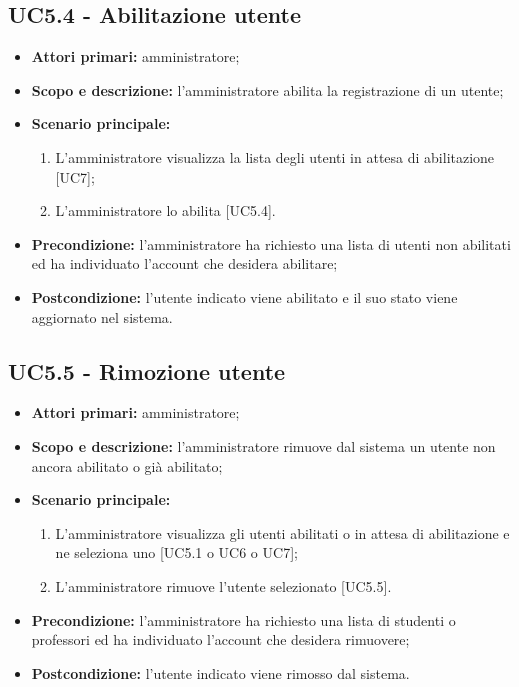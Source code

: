 \documentclass[AnalisiDeiRequisiti.tex]{subfiles}
\begin{document}
\subsection{UC5.4 - Abilitazione utente}
\begin{itemize}
	\item \textbf{Attori primari:} amministratore;
	\item \textbf{Scopo e descrizione:} l'amministratore abilita la registrazione di un utente;
	\item \textbf{Scenario principale:}
	\begin{enumerate}
		\item L'amministratore visualizza la lista degli utenti in attesa di abilitazione [UC7];
		\item L'amministratore lo abilita [UC5.4].
	\end{enumerate}
	\item \textbf{Precondizione:} l'amministratore ha richiesto una lista di utenti non abilitati ed ha individuato l'account che desidera abilitare; 
	\item \textbf{Postcondizione:} l'utente indicato viene abilitato e il suo stato viene aggiornato nel sistema.
\end{itemize}
\subsection{UC5.5 - Rimozione utente}
\begin{itemize}
	\item \textbf{Attori primari:} amministratore;
	\item \textbf{Scopo e descrizione:} l'amministratore rimuove dal sistema un utente non ancora abilitato o già abilitato;
	\item \textbf{Scenario principale:}
	\begin{enumerate}
		\item L'amministratore visualizza gli utenti abilitati o in attesa di abilitazione e ne seleziona uno [UC5.1 o UC6 o UC7];
		\item L'amministratore rimuove l'utente selezionato [UC5.5].
	\end{enumerate}
	\item \textbf{Precondizione:} l'amministratore ha richiesto una lista di studenti o professori ed ha individuato l'account che desidera rimuovere;
	\item \textbf{Postcondizione:} l'utente indicato viene rimosso dal sistema.
\end{itemize}
\end{document}
